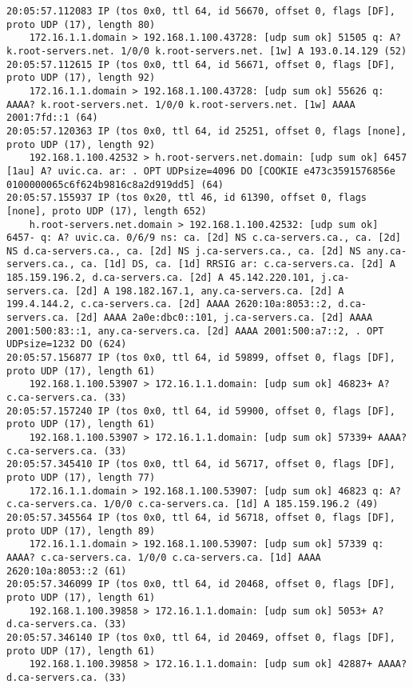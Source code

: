 \documentclass{article}
\begin{document}
{\begin{lstlisting}
20:05:57.112083 IP (tos 0x0, ttl 64, id 56670, offset 0, flags [DF], proto UDP (17), length 80)
    172.16.1.1.domain > 192.168.1.100.43728: [udp sum ok] 51505 q: A? k.root-servers.net. 1/0/0 k.root-servers.net. [1w] A 193.0.14.129 (52)
20:05:57.112615 IP (tos 0x0, ttl 64, id 56671, offset 0, flags [DF], proto UDP (17), length 92)
    172.16.1.1.domain > 192.168.1.100.43728: [udp sum ok] 55626 q: AAAA? k.root-servers.net. 1/0/0 k.root-servers.net. [1w] AAAA 2001:7fd::1 (64)
20:05:57.120363 IP (tos 0x0, ttl 64, id 25251, offset 0, flags [none], proto UDP (17), length 92)
    192.168.1.100.42532 > h.root-servers.net.domain: [udp sum ok] 6457 [1au] A? uvic.ca. ar: . OPT UDPsize=4096 DO [COOKIE e473c3591576856e 0100000065c6f624b9816c8a2d919dd5] (64)
20:05:57.155937 IP (tos 0x20, ttl 46, id 61390, offset 0, flags [none], proto UDP (17), length 652)
    h.root-servers.net.domain > 192.168.1.100.42532: [udp sum ok] 6457- q: A? uvic.ca. 0/6/9 ns: ca. [2d] NS c.ca-servers.ca., ca. [2d] NS d.ca-servers.ca., ca. [2d] NS j.ca-servers.ca., ca. [2d] NS any.ca-servers.ca., ca. [1d] DS, ca. [1d] RRSIG ar: c.ca-servers.ca. [2d] A 185.159.196.2, d.ca-servers.ca. [2d] A 45.142.220.101, j.ca-servers.ca. [2d] A 198.182.167.1, any.ca-servers.ca. [2d] A 199.4.144.2, c.ca-servers.ca. [2d] AAAA 2620:10a:8053::2, d.ca-servers.ca. [2d] AAAA 2a0e:dbc0::101, j.ca-servers.ca. [2d] AAAA 2001:500:83::1, any.ca-servers.ca. [2d] AAAA 2001:500:a7::2, . OPT UDPsize=1232 DO (624)
20:05:57.156877 IP (tos 0x0, ttl 64, id 59899, offset 0, flags [DF], proto UDP (17), length 61)
    192.168.1.100.53907 > 172.16.1.1.domain: [udp sum ok] 46823+ A? c.ca-servers.ca. (33)
20:05:57.157240 IP (tos 0x0, ttl 64, id 59900, offset 0, flags [DF], proto UDP (17), length 61)
    192.168.1.100.53907 > 172.16.1.1.domain: [udp sum ok] 57339+ AAAA? c.ca-servers.ca. (33)
20:05:57.345410 IP (tos 0x0, ttl 64, id 56717, offset 0, flags [DF], proto UDP (17), length 77)
    172.16.1.1.domain > 192.168.1.100.53907: [udp sum ok] 46823 q: A? c.ca-servers.ca. 1/0/0 c.ca-servers.ca. [1d] A 185.159.196.2 (49)
20:05:57.345564 IP (tos 0x0, ttl 64, id 56718, offset 0, flags [DF], proto UDP (17), length 89)
    172.16.1.1.domain > 192.168.1.100.53907: [udp sum ok] 57339 q: AAAA? c.ca-servers.ca. 1/0/0 c.ca-servers.ca. [1d] AAAA 2620:10a:8053::2 (61)
20:05:57.346099 IP (tos 0x0, ttl 64, id 20468, offset 0, flags [DF], proto UDP (17), length 61)
    192.168.1.100.39858 > 172.16.1.1.domain: [udp sum ok] 5053+ A? d.ca-servers.ca. (33)
20:05:57.346140 IP (tos 0x0, ttl 64, id 20469, offset 0, flags [DF], proto UDP (17), length 61)
    192.168.1.100.39858 > 172.16.1.1.domain: [udp sum ok] 42887+ AAAA? d.ca-servers.ca. (33)

\end{lstlisting}}
\end{document}
